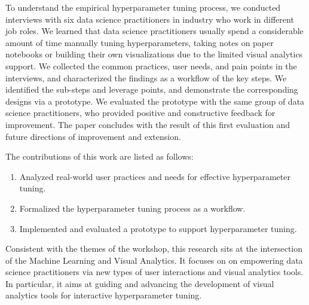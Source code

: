 \documentclass[preprint]{vgtc}        %
\newcommand{\skye}[1]{{ #1}}
\begin{document}
To understand the empirical hyperparameter tuning process, we conducted interviews with six data science practitioners in industry who work in different job roles. We learned that data science practitioners usually spend a considerable amount of time manually tuning hyperparameters, taking notes on paper notebooks or building their own visualizations due to the limited visual analytics support. We collected the common practices, user needs, and pain points in the interviews, and characterized the findings as a workflow of the key steps. We identified the sub-steps and leverage points, and demonstrate the corresponding designs via a prototype. We evaluated the prototype with the same group of data science practitioners, who provided positive and constructive feedback for improvement. The paper concludes with the result of this first evaluation and \skye{future directions of improvement and extension}.

The contributions of this work are listed as follows:
\begin{enumerate}
\item Analyzed real-world user practices and needs for effective hyperparameter tuning.
\item Formalized the hyperparameter tuning \skye{process as a} workflow. 
\item Implemented and evaluated a prototype to support hyperparameter tuning.
\end{enumerate}

Consistent with the themes of the workshop, this research sits at the intersection of the Machine Learning and Visual Analytics. It focuses on on empowering data science practitioners via new types of user interactions and visual analytics tools. In particular, it aims at guiding and advancing the development of visual analytics tools for interactive hyperparameter tuning.
\end{document}
